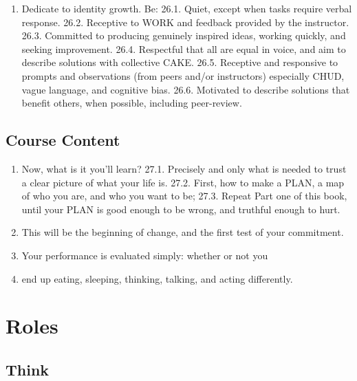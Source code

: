 \documentclass[
]{book}
\providecommand{\tightlist}{%
  \setlength{\itemsep}{0pt}\setlength{\parskip}{0pt}}
\begin{document}
\begin{enumerate}
\def\labelenumi{\arabic{enumi}.}
\setcounter{enumi}{25}
\tightlist
\item
  Dedicate to identity growth. Be:
  26.1. Quiet, except when tasks require verbal response.
  26.2. Receptive to WORK and feedback provided by the instructor.
  26.3. Committed to producing genuinely inspired ideas, working quickly, and seeking improvement.
  26.4. Respectful that all are equal in voice, and aim to describe solutions with collective CAKE.
  26.5. Receptive and responsive to prompts and observations (from peers and/or
  instructors) especially CHUD, vague language, and cognitive bias.
  26.6. Motivated to describe solutions that benefit others, when possible,
  including peer-review.
\end{enumerate}

\hypertarget{course-content}{%
\subsection{Course Content}\label{course-content}}

\begin{enumerate}
\def\labelenumi{\arabic{enumi}.}
\setcounter{enumi}{26}
\tightlist
\item
  Now, what is it you'll learn?
  27.1. Precisely and only what is needed to trust a clear picture of what your life
  is.
  27.2. First, how to make a PLAN, a map of who you are, and who you want to be;
  27.3. Repeat Part one of this book, until your PLAN is good enough to be wrong,
  and truthful enough to hurt.
\item
  This will be the beginning of change, and the first test of your commitment.
\item
  Your performance is evaluated simply: whether or not you
\item
  end up eating, sleeping, thinking, talking, and acting differently.
\end{enumerate}

\hypertarget{roles}{%
\section{Roles}\label{roles}}

\hypertarget{think}{%
\subsection{Think}\label{think}}
\end{document}
